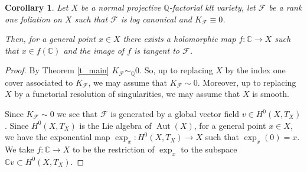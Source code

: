 \documentclass[10pt,a4paper]{amsart}
\newtheorem{corollary}{Corollary}
\DeclareMathOperator{\Aut}{Aut}
\begin{document}
\begin{corollary}
\label{cor_hyperbolicity}
Let $X$ be a normal projective $\mathbb Q$-factorial klt variety, let $\mathcal F$ be a rank one foliation on $X$ such that $\mathcal F$ is log canonical and  
$K_{\mathcal F}\equiv 0$.

Then, for a general point $x \in X$ there exists a holomorphic map $f\colon \mathbb C \to X$ such that 
$x \in f(\mathbb C)$ and the image of $f$ is tangent to $\mathcal F$.
\end{corollary}

\begin{proof}
By Theorem \ref{t_main} $K_{\mathcal F}\sim_{\mathbb Q} 0$.  So, up to replacing $X$ by the index one cover associated to $K_{\mathcal F}$, we may assume that $K_{\mathcal F} \sim 0$.
Moreover, up to replacing $X$ by a functorial resolution of singularities, we may assume that $X$ is smooth.

Since $K_{\mathcal F} \sim 0$ we see that  $\mathcal F$ is generated by a global vector field $v \in H^0(X, T_X)$.  Since $H^0(X, T_X)$ is the Lie algebra of $\Aut (X)$, 
for a general point $x \in X$, we have the exponential map $\exp_x\colon H^0(X, T_X) \to X$ such
that $\exp_x(0) = x$.  We take $f\colon \mathbb C \to X$ to be the restriction of $\exp_x$ to the subspace $\mathbb Cv \subset H^0(X, T_X)$. 
\end{proof}
\end{document}
